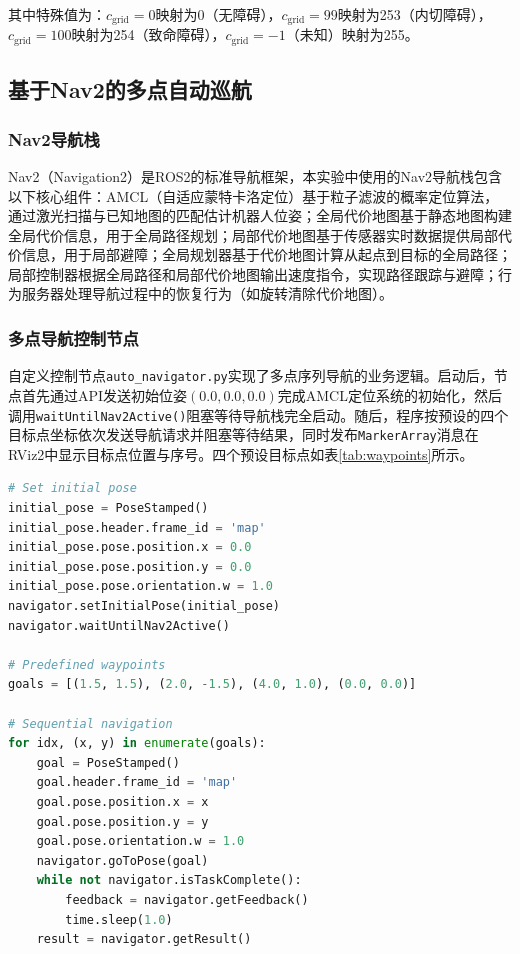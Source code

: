 \documentclass[a4paper,12pt]{article}
\begin{document}
其中特殊值为：$c_{\text{grid}} = 0$映射为0（无障碍），$c_{\text{grid}} = 99$映射为253（内切障碍），$c_{\text{grid}} = 100$映射为254（致命障碍），$c_{\text{grid}} = -1$（未知）映射为255。

\subsection{基于Nav2的多点自动巡航}

\subsubsection{Nav2导航栈}

Nav2（Navigation2）是ROS2的标准导航框架，本实验中使用的Nav2导航栈包含以下核心组件：AMCL（自适应蒙特卡洛定位）基于粒子滤波的概率定位算法，通过激光扫描与已知地图的匹配估计机器人位姿；全局代价地图基于静态地图构建全局代价信息，用于全局路径规划；局部代价地图基于传感器实时数据提供局部代价信息，用于局部避障；全局规划器基于代价地图计算从起点到目标的全局路径；局部控制器根据全局路径和局部代价地图输出速度指令，实现路径跟踪与避障；行为服务器处理导航过程中的恢复行为（如旋转清除代价地图）。

\subsubsection{多点导航控制节点}

自定义控制节点\texttt{auto\_navigator.py}实现了多点序列导航的业务逻辑。启动后，节点首先通过API发送初始位姿$(0.0, 0.0, 0.0)$完成AMCL定位系统的初始化，然后调用\texttt{waitUntilNav2Active()}阻塞等待导航栈完全启动。随后，程序按预设的四个目标点坐标依次发送导航请求并阻塞等待结果，同时发布\texttt{MarkerArray}消息在RViz2中显示目标点位置与序号。四个预设目标点如表\ref{tab:waypoints}所示。

\begin{lstlisting}[language=Python,title={多点导航核心代码（auto\_navigator.py）}]
# Set initial pose
initial_pose = PoseStamped()
initial_pose.header.frame_id = 'map'
initial_pose.pose.position.x = 0.0
initial_pose.pose.position.y = 0.0
initial_pose.pose.orientation.w = 1.0
navigator.setInitialPose(initial_pose)
navigator.waitUntilNav2Active()

# Predefined waypoints
goals = [(1.5, 1.5), (2.0, -1.5), (4.0, 1.0), (0.0, 0.0)]

# Sequential navigation
for idx, (x, y) in enumerate(goals):
    goal = PoseStamped()
    goal.header.frame_id = 'map'
    goal.pose.position.x = x
    goal.pose.position.y = y
    goal.pose.orientation.w = 1.0
    navigator.goToPose(goal)
    while not navigator.isTaskComplete():
        feedback = navigator.getFeedback()
        time.sleep(1.0)
    result = navigator.getResult()
\end{lstlisting}
\end{document}
